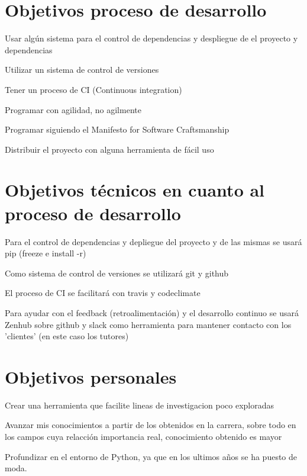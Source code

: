 \section{Objetivos proceso de desarrollo}
\begin{list}{-}{}
\item Usar algún sistema para el control de dependencias y despliegue de el proyecto y dependencias
\item Utilizar un sistema de control de versiones
\item Tener un proceso de CI (Continuous integration) 
\item Programar con agilidad, no agilmente 
\item Programar siguiendo el Manifesto for Software Craftsmanship
\item Distribuir el proyecto con alguna herramienta de fácil uso
\end{list}

\section{Objetivos técnicos en cuanto al proceso de desarrollo}
\begin{list}{-}{}
\item Para el control de dependencias y depliegue del proyecto y de las mismas se usará pip (freeze e install -r)
\item Como sistema de control de versiones se utilizará git y github
\item El proceso de CI se facilitará con travis y codeclimate
\item Para ayudar con el feedback (retroalimentación) y el desarrollo continuo se usará Zenhub sobre github y slack como herramienta para mantener contacto con los 'clientes' (en este caso los tutores)
\end{list}

\section{Objetivos personales}
\begin{list}{-}{}
\item Crear una herramienta que facilite lineas de investigacion poco exploradas
\item Avanzar mis conocimientos a partir de los obtenidos en la carrera, sobre todo en los campos cuya relacción importancia real, conocimiento obtenido es mayor
\item Profundizar en el entorno de Python, ya que en los ultimos años se ha puesto de moda.
\end{list}

